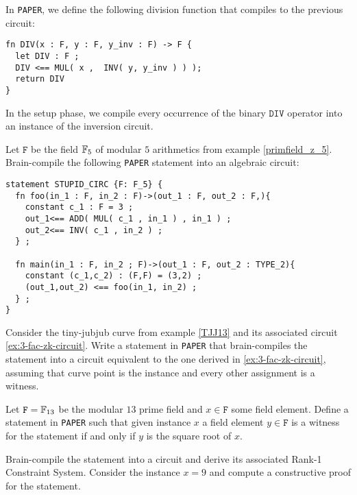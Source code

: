 In \texttt{PAPER}, we define the following division function that compiles to the previous circuit:
\begin{lstlisting}
fn DIV(x : F, y : F, y_inv : F) -> F {
  let DIV : F ;
  DIV <== MUL( x ,  INV( y, y_inv ) ) );
  return DIV
}
\end{lstlisting}
In the setup phase, we compile every occurrence of the binary $\mathtt{DIV}$ operator into an instance of the inversion circuit.
\begin{exercise} Let $\mathtt{F}$ be the field $\mathbb{F}_5$ of modular $5$ arithmetics from example \ref{primfield_z_5}. Brain-compile the following \texttt{PAPER} statement into an algebraic circuit:
\begin{lstlisting}
statement STUPID_CIRC {F: F_5} {
  fn foo(in_1 : F, in_2 : F)->(out_1 : F, out_2 : F,){
    constant c_1 : F = 3 ;
    out_1<== ADD( MUL( c_1 , in_1 ) , in_1 ) ;
    out_2<== INV( c_1 , in_2 ) ;
  } ;
    
  fn main(in_1 : F, in_2 ; F)->(out_1 : F, out_2 : TYPE_2){
	constant (c_1,c_2) : (F,F) = (3,2) ;
    (out_1,out_2) <== foo(in_1, in_2) ;
  } ;
}
\end{lstlisting}
\end{exercise}
\begin{exercise} Consider the tiny-jubjub curve from example \ref{TJJ13} and its associated circuit \ref{ex:3-fac-zk-circuit}. Write a statement in \texttt{PAPER} that brain-compiles the statement into a circuit equivalent to the one derived in \ref{ex:3-fac-zk-circuit}, assuming that curve point is the instance and every other assignment is a witness. 
\end{exercise}
\begin{exercise} Let $\mathtt{F}=\mathbb{F}_{13}$ be the modular $13$ prime field and $x\in\mathtt{F}$ some field element. Define a statement in \texttt{PAPER} such that given instance $x$ a field element $y\in\mathtt{F}$ is a witness for the statement if and only if $y$ is the square root of $x$.  

Brain-compile the statement into a circuit and derive its associated Rank-1 Constraint System. Consider the instance $x=9$ and compute a constructive proof for the statement. 
\begin{comment}
statement KNOWLEDGE_OF_SQUARE_ROOT {F} {
  fn SQUARE(x : F)->(xx : F){
    xx<== MUL( x , x ) ;
  } ;
    
  fn main(pub x : F, y : F )->(){
    constant c_1 : F = 0 ;
    c_1 <==  SUB( x , SQUARE( y , y ) );
  } ;
}
\end{lstlisting}
\end{comment}
\end{exercise}

